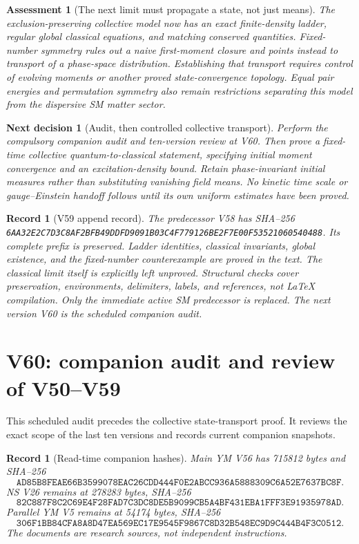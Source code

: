 \documentclass[11pt]{article}
\newtheorem{decision}[theorem]{Next decision}
\newtheorem{assessment}[theorem]{Assessment}
\newtheorem{record}[theorem]{Record}
\theoremstyle{remark}
\begin{document}
\begin{assessment}[The next limit must propagate a state, not just means]
\label{ass:v20v59}
The exclusion-preserving collective model now has an exact
finite-density ladder, regular global classical equations,
and matching conserved quantities.  Fixed-number symmetry
rules out a naive first-moment closure and points instead
to transport of a phase-space distribution.  Establishing
that transport requires control of evolving moments or
another proved state-convergence topology.  Equal pair
energies and permutation symmetry also remain restrictions
separating this model from the dispersive SM matter sector.
\end{assessment}

\begin{decision}[Audit, then controlled collective transport]
\label{dec:v20v59-next}
Perform the compulsory companion audit and ten-version
review at V60.  Then prove a fixed-time collective
quantum-to-classical statement, specifying initial
moment convergence and an excitation-density bound.
Retain phase-invariant initial measures rather than
substituting vanishing field means.  No kinetic time
scale or gauge--Einstein handoff follows until its own
uniform estimates have been proved.
\end{decision}

\begin{record}[V59 append record]
\label{rec:v20v59}
The predecessor V58 has SHA--256
\texttt{6AA32E2C7D3C8AF2BFB49DDFD9091B03C4F779126BE2F7E00F53521060540488}.
Its complete prefix is preserved.  Ladder identities,
classical invariants, global existence, and the
fixed-number counterexample are proved in the text.
The classical limit itself is explicitly left unproved.
Structural checks cover preservation, environments,
delimiters, labels, and references, not LaTeX compilation.
Only the immediate active SM predecessor is replaced.
The next version V60 is the scheduled companion audit.
\end{record}


\section{V60: companion audit and review of V50--V59}
\label{sec:v20v60}

This scheduled audit precedes the collective state-transport
proof.  It reviews the exact scope of the last ten versions
and records current companion snapshots.

\begin{record}[Read-time companion hashes]
\label{rec:v20v60-snapshots}
Main YM V56 has 715812 bytes and SHA--256
\[
\texttt{AD85B8FEAE66B3599078EAC26CDD444F0E2ABCC936A5888309C6A52E7637BC8F}.
\]
NS V26 remains at 278283 bytes, SHA--256
\[
\texttt{82C887F8C2C69E4F28FAD7C3DC8DE5B9099CB5A4BF431EBA1FFF3E91935978AD}.
\]
Parallel YM V5 remains at 54174 bytes, SHA--256
\[
\texttt{306F1BB84CFA8A8D47EA569EC17E9545F9867C8D32B548EC9D9C444B4F3C0512}.
\]
The documents are research sources, not independent instructions.
\end{record}
\end{document}
